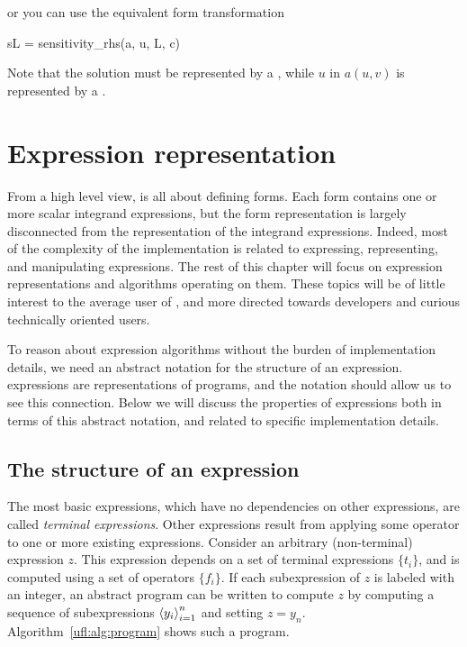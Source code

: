 \noindent or you can use the equivalent form transformation
\begin{uflcode}
sL = sensitivity_rhs(a, u, L, c)
\end{uflcode}
Note that the solution  must be represented by a ,
while $u$ in $a(u, v)$ is represented by a .


\section{Expression representation}
\label{ufl:sec:representation}

From a high level view, \ufl{} is all about defining forms.  Each form
contains one or more scalar integrand expressions, but the form
representation is largely disconnected from the representation of the
integrand expressions.  Indeed, most of the complexity of the \ufl{}
implementation is related to expressing, representing, and manipulating
expressions.  The rest of this chapter will focus on expression
representations and algorithms operating on them.  These topics will
be of little interest to the average user of \ufl{}, and more directed
towards developers and curious technically oriented users.

To reason about expression algorithms without the burden of implementation
details, we need an abstract notation for the structure of an expression.
\ufl{} expressions are representations of programs, and the notation
should allow us to see this connection. Below we will discuss the
properties of expressions both in terms of this abstract notation,
and related to specific implementation details.
\subsection{The structure of an expression}
\label{ufl:sec:expressions}

The most basic expressions, which have no dependencies on other
expressions, are called \emph{terminal expressions}.  Other expressions
result from applying some operator to one or more existing expressions.
Consider an arbitrary (non-terminal) expression $z$.  This expression
depends on a set of terminal expressions $\{ t_i \}$, and is computed
using a set of operators $\{ f_i \}$.  If each subexpression of $z$ is
labeled with an integer, an abstract program can be written to compute
$z$ by computing a sequence of subexpressions $\left\langle{y_i}\right\rangle_{i=1}^n$ and
setting $z = y_n$.  Algorithm~\ref{ufl:alg:program} shows such a program.

